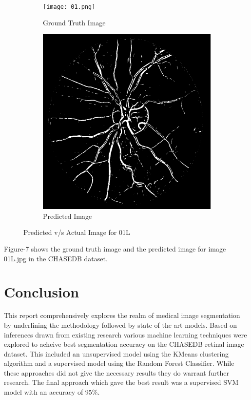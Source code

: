 \documentclass{article}
\begin{document}
\begin{figure}
  \centering
  \begin{subfigure}{0.45\textwidth}
    \texttt{[image: 01.png]}
    \caption{Ground Truth Image}
  \end{subfigure}
  \hfill
  \begin{subfigure}{0.45\textwidth}
    \includegraphics[width=\linewidth]{prediction1.png}
    \caption{Predicted Image}
  \end{subfigure}
  \caption{Predicted v/s Actual Image for 01L}
\end{figure}

Figure-7 shows the ground truth image and the predicted image for image 01L.jpg in the CHASEDB dataset.

\section{ Conclusion }

This report comprehensively explores the realm of medical image segmentation by underlining the methodology followed by state of the art models. Based on inferences drawn from existing research various machine learning techniques were explored to acheive best segmentation accuracy on the CHASEDB retinal image dataset. This included an unsupervised model using the KMeans clustering algorithm and a supervised model using the Random Forest Classifier. While these approaches did not give the necessary results they do warrant further research. The final approach which gave the best result was a supervised SVM model with an accuracy of 95\%. 
\end{document}
